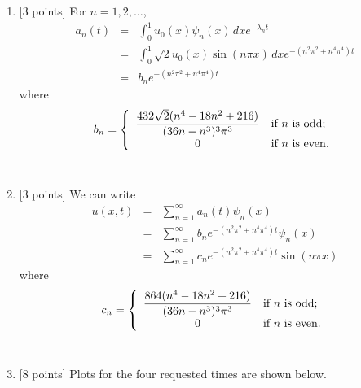 \begin{solution}
\begin{enumerate}
\item {[3 points]} For $n=1,2,\ldots$,
\begin{eqnarray*}
a_n(t)&=&\int_0^1u_0(x)\psi_n(x)\,dx e^{-\lambda_n t}
\\
&=&\int_0^1\sqrt{2}u_0(x)\sin(n\pi x)\,dx e^{-(n^2\pi^2 + n^4\pi^4)t}
\\
&=&b_n e^{-(n^2\pi^2 + n^4\pi^4)t}
\end{eqnarray*}
where
\[
b_n=\left\{ \begin{array}{cl} \displaystyle{{432\sqrt{2} (n^4-18n^2 + 216) \over (36n-n^3)^3 \pi^3}} & \mbox{if }n\mbox{ is odd}; \\0 & \mbox{if }n\mbox{ is even}.\end{array}\right.
\]
\\
\item {[3 points]} We can write
\begin{eqnarray*}
u(x,t) &=& \sum_{n=1}^\infty a_n(t) \psi_n(x)
\\
&=& \sum_{n=1}^\infty b_n e^{-(n^2\pi^2 + n^4\pi^4)t} \psi_n(x)
\\
&=& \sum_{n=1}^\infty c_n e^{-(n^2\pi^2 + n^4\pi^4)t} \sin(n\pi x)
\end{eqnarray*}
where
\[
c_n=\left\{ \begin{array}{cl} \displaystyle{{864 (n^4-18n^2 + 216) \over (36n-n^3)^3 \pi^3}} & \mbox{if }n\mbox{ is odd}; \\0 & \mbox{if }n\mbox{ is even}.\end{array}\right.
\]
\\
\item {[8 points]} Plots for the four requested times are shown below.


\end{enumerate}
\end{solution}
